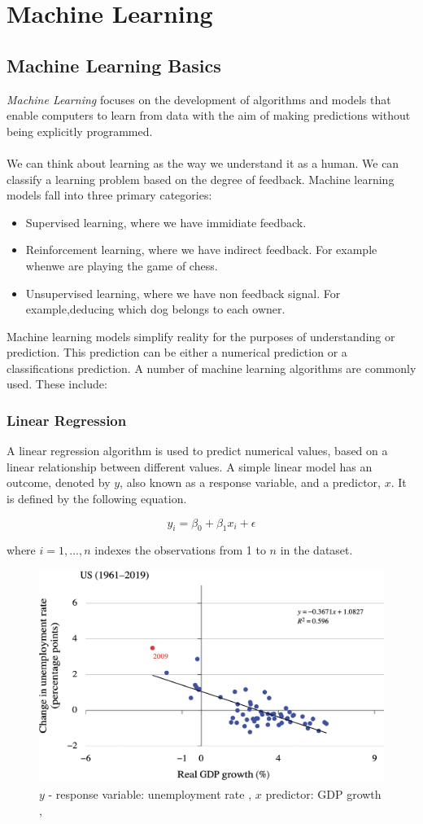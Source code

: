 \documentclass[../main.tex]{subfiles}
\begin{document}
	\chapter{Machine Learning} \label{ch:machine}
	

	\section{Machine Learning Basics}
	\noindent 
	
	\noindent  \textit{Machine Learning} focuses on the development of algorithms and models that enable computers to learn from data with the aim of making predictions without being explicitly programmed.\\ \\  
	We can think about learning as the way we understand it as a human. We can classify a learning problem based on the degree of feedback. Machine learning models fall into three primary categories:
	\begin{itemize}
		\item Supervised learning, where we have immidiate feedback.
		\item Reinforcement learning, where we have indirect feedback. For example whenwe are playing the game of chess.
		\item Unsupervised learning, where we have non feedback signal. For example,deducing which dog belongs to each owner.
	\end{itemize}
	Machine learning models simplify reality for the purposes of understanding or prediction. This prediction can be either a numerical prediction or a classifications prediction. 
	A number of machine learning algorithms are commonly used. These include: 
	\subsection{Linear Regression}
	\noindent A linear regression algorithm is used to predict numerical values, based on a linear relationship between different values. A simple linear model has an outcome, denoted by $y$, also known as a response variable,  and a predictor, $x$. It is defined by the following equation.
	
	$$ y_i= \beta_0 + \beta_1 x_i + \epsilon $$

	 \noindent where $ i = 1, ..., n$  indexes the observations from 1 to $n$ in the dataset.

	\begin{figure}[h]
		\centering
		\includegraphics[width=0.6\linewidth]{imgs/gdp.png}
		 \caption{\small $y$ - response variable: unemployment rate , $x$ predictor: GDP growth , } 
	\end{figure} \mbox{} \par
\end{document}
